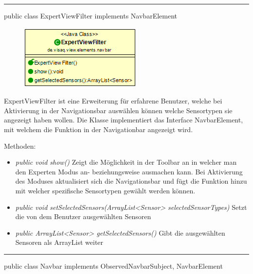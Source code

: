 

\rule{\textwidth}{0.4pt}
public class ExpertViewFilter implements NavbarElement

\begin{minipage}{0.3\textwidth}
    \begin{figure}[H]
        \includegraphics[scale = 0.6]{media/frontend/view/de.view.elements.navbar/ExpertviewFilterClass.png}
    \end{figure}
    \end{minipage} \hfill
    \begin{minipage}{0.6\textwidth}
ExpertViewFilter ist eine Erweiterung für erfahrene Benutzer, welche bei Aktivierung in der Navigationsbar auswählen können welche Sensortypen sie angezeigt haben wollen. Die Klasse implementiert das Interface NavbarElement, mit welchem die Funktion in der Navigationbar angezeigt wird.
\end{minipage}

Methoden:
\begin{itemize}
    \item \emph{public void show()} Zeigt die Möglichkeit in der Toolbar an in welcher man den Experten Modus an- beziehungsweise ausmachen kann. Bei Aktivierung des Moduses aktualisiert sich die Navigationsbar und fügt die Funktion hinzu mit welcher spezifische Sensortypen gewählt werden können.
    \item \emph{public void setSelectedSensors(ArrayList<Sensor> selectedSensorTypes)} Setzt die von dem Benutzer ausgewählten Sensoren
    \item \emph{public ArrayList<Sensor> getSelectedSensors()} Gibt die ausgewählten Sensoren als ArrayList weiter
\end{itemize}
\clearpage %
\rule{\textwidth}{0.4pt}
public class Navbar implements ObservedNavbarSubject, NavbarElement

